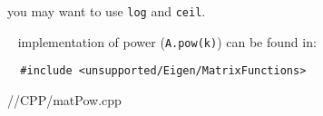 \begin{problem}
\begin{subproblem}[2]
\begin{hint}
 you may want to use \texttt{log} and \texttt{ceil}.
\end{hint}

\begin{hint}
 \Eigen~ implementation of power (\texttt{A.pow(k)}) can be found in:
 \begin{verbatim}
  #include <unsupported/Eigen/MatrixFunctions>
 \end{verbatim}
\end{hint}

\begin{solution}

{\problems/\chpt/CPP/matPow.cpp}
\end{solution}
\end{subproblem}
\end{problem}

